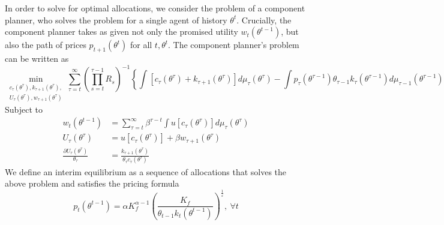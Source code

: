 \documentclass[11pt]{article}
\begin{document}
In order to solve for optimal allocations, we consider the problem of a component planner, who solves the problem
for a single agent of history $\theta^{t}$. Crucially, the component
planner takes as given not only the promised utility $w_{t}\left(\theta^{t-1}\right)$,
but also the path of prices $p_{t+1}\left(\theta^{t}\right)$ for
all $t,\theta^{t}$. The component planner's problem can be written
as 
\begin{equation}
\min_{\substack{c_{\tau}\left(\theta^{\tau}\right),k_{\tau+1}\left(\theta^{\tau}\right),\\
U_{\tau}\left(\theta^{\tau}\right),w_{\tau+1}\left(\theta^{\tau}\right)
}
}\sum_{\tau=t}^{\infty}\left(\prod_{s=t}^{\tau-1}R_{s}\right)^{-1}\left\{ \int\left[c_{\tau}\left(\theta^{\tau}\right)+k_{\tau+1}\left(\theta^{\tau}\right)\right]d\mu_{\tau}\left(\theta^{\tau}\right)-\int p_{\tau}\left(\theta^{\tau-1}\right)\theta_{\tau-1}k_{\tau}\left(\theta^{\tau-1}\right)d\mu_{\tau-1}\left(\theta^{\tau-1}\right)\right\} \label{eq:cpp_seq}
\end{equation}
Subject to 
\begin{align}
w_{t}\left(\theta^{t-1}\right) & =\sum_{\tau=t}^{\infty}\beta^{\tau-t}\int u\left[c_{\tau}\left(\theta^{\tau}\right)\right]d\mu_{\tau}\left(\theta^{\tau}\right)\\
U_{\tau}\left(\theta^{\tau}\right) & =u\left[c_{\tau}\left(\theta^{\tau}\right)\right]+\beta w_{\tau+1}\left(\theta^{\tau}\right)\\
\frac{\partial U_{\tau}\left(\theta^{\tau}\right)}{\theta_{\tau}} & =\frac{k_{\tau+1}\left(\theta^{\tau}\right)}{\theta_{\tau}c_{\tau}\left(\theta^{\tau}\right)}
\end{align}
We define an interim equilibrium as a sequence of allocations that solves
the above problem and satisfies the pricing formula 
\begin{equation}
p_{t}\left(\theta^{t-1}\right)=\alpha K_{f}^{\alpha-1}\left(\frac{K_{f}}{\theta_{t-1}k_{t}\left(\theta^{t-1}\right)}\right)^{\frac{1}{\varepsilon}},\ \forall t
\end{equation}
 
\end{document}
